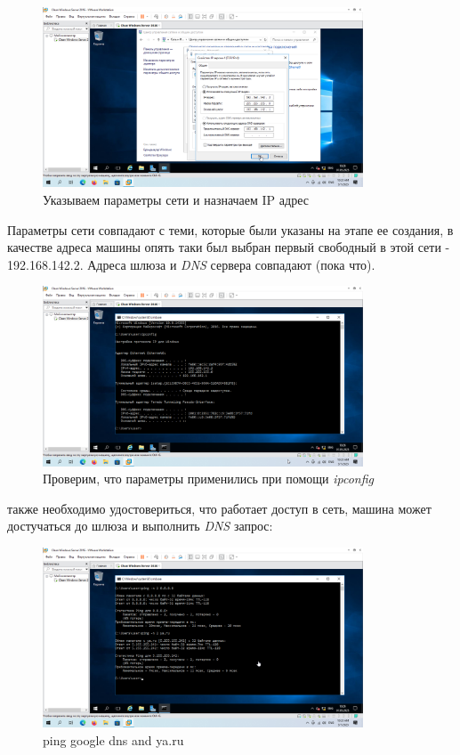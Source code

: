 \documentclass[a4paper]{article}
\begin{document}
  \begin{figure}[H]
    \centering
    \includegraphics[width=0.85\textwidth]{9_0020}
    \caption{Указываем параметры сети и назначаем IP адрес}
    \label{img:0020}
  \end{figure}

  Параметры сети совпадают с теми, которые были указаны на этапе ее создания,
  в качестве адреса машины опять таки был выбран первый свободный в этой сети -
  192.168.142.2. Адреса шлюза и \textit{DNS} сервера совпадают (пока что).

  \begin{figure}[H]
    \centering
    \includegraphics[width=0.85\textwidth]{9_0021}
    \caption{Проверим, что параметры применились при помощи \textit{ipconfig}}
    \label{img:0021}
  \end{figure}

  также необходимо удостовериться, что работает доступ в сеть, машина может достучаться
  до шлюза и выполнить \textit{DNS} запрос:

  \begin{figure}[H]
    \centering
    \includegraphics[width=0.85\textwidth]{9_0022}
    \caption{ping google dns and ya.ru}
    \label{img:0022}
  \end{figure}
\end{document}

